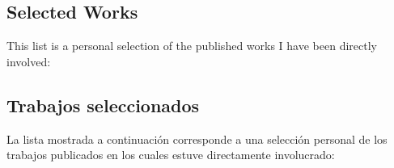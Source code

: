 \ifeng
\subsection*{Selected Works}
\noindent

This list is a personal selection of the published works I have been directly involved:

\else
\subsection*{Trabajos seleccionados}
\noindent

La lista mostrada a continuación corresponde a una selección personal de los trabajos publicados en los cuales estuve directamente involucrado:
\fi

